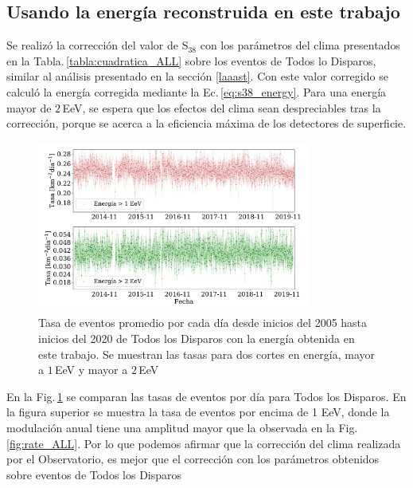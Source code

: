 \subsection{Usando la energía reconstruida en este trabajo}

Se realizó la corrección del valor de S$_{38}$ con los parámetros del clima presentados en la Tabla.\,\ref{tabla:cuadratica_ALL} sobre los eventos de Todos lo Disparos, similar al análisis presentado en la sección \ref{laaast}. Con este valor corregido se calculó la energía corregida mediante la Ec.\,\ref{eq:s38_energy}. Para una energía mayor de $2\,$EeV, se espera que los efectos del clima sean despreciables tras la corrección, porque se acerca a la eficiencia máxima de los detectores de superficie. 



\begin{figure}[H]
  \centering
  \includegraphics[width=0.8\textwidth]{../04_Clima/Graphs/rate_dayly/AllTriggers_1EeV_2EeV_rate_reconstruction.pdf}
  \caption{Tasa de eventos promedio por cada día desde inicios del 2005 hasta inicios del 2020 de Todos los Disparos con la energía obtenida en este trabajo. Se muestran las tasas para dos cortes en energía, mayor a $1\,$EeV y mayor a $2\,$EeV}\label{fig:rate_reconst}
\end{figure}

En la Fig.\,\ref{fig:rate_reconst} se comparan las tasas de eventos por día para Todos los Disparos. En la figura superior se muestra la tasa de eventos por encima de 1 EeV, donde la modulación anual tiene una amplitud mayor que la observada en la Fig.\ref{fig:rate_ALL}. Por lo que podemos afirmar que la corrección del clima realizada por el Observatorio, es mejor que el corrección con los parámetros obtenidos sobre eventos de Todos los Disparos



